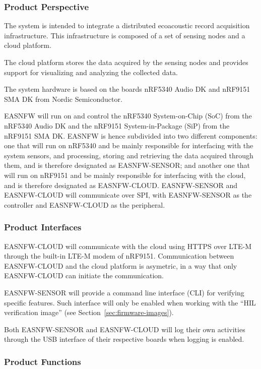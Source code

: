 \documentclass[11pt,a4paper]{article}
\begin{document}
\subsubsection{Product Perspective}

The system is intended to integrate a distributed ecoacoustic record acquisition
infrastructure. This infrastructure is composed of a set of sensing nodes and a
cloud platform.

The cloud platform stores the data acquired by the sensing nodes and provides
support for visualizing and analyzing the collected data.

The system hardware is based on the boards nRF5340 Audio DK and nRF9151 SMA DK
from Nordic Semiconductor.

EASNFW will run on and control the nRF5340 System-on-Chip (SoC) from the
nRF5340 Audio DK and the nRF9151 System-in-Package (SiP) from the nRF9151 SMA
DK. EASNFW is hence subdivided into two different components: one that will run
on nRF5340 and be mainly responsible for interfacing with the system sensors,
and processing, storing and retrieving the data acquired through them, and is
therefore designated as EASNFW-SENSOR; and another one that will run on nRF9151
and be mainly responsible for interfacing with the cloud, and is therefore
designated as EASNFW-CLOUD. EASNFW-SENSOR and EASNFW-CLOUD will communicate
over SPI, with EASNFW-SENSOR as the controller and EASNFW-CLOUD as the
peripheral.

\subsubsection{Product Interfaces}

EASNFW-CLOUD will communicate with the cloud using HTTPS over LTE-M through the
built-in LTE-M modem of nRF9151. Communication between EASNFW-CLOUD and the
cloud platform is asymetric, in a way that only EASNFW-CLOUD can initiate the
communication.

EASNFW-SENSOR will provide a command line interface (CLI) for verifying
specific features. Such interface will only be enabled when working with the
``HIL verification image'' (see Section~\ref{sec:firmware-images}).

Both EASNFW-SENSOR and EASNFW-CLOUD will log their own activities through the
USB interface of their respective boards when logging is enabled.

\subsubsection{Product Functions}
\end{document}
